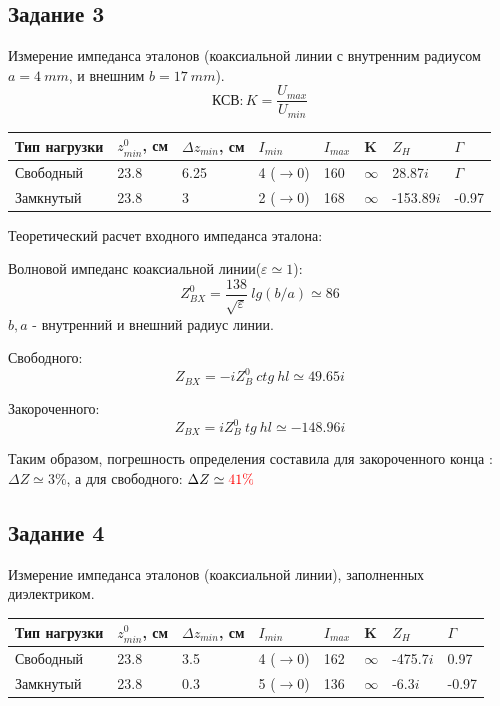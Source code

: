 \subsection{Задание 3}
Измерение импеданса эталонов (коаксиальной линии с внутренним радиусом $a = 4~mm$, и внешним $b=17~mm$).
$$\textbf{КСВ}: K = \frac{U_{max}}{U_{min}}$$
\begin{table}[H]
    \centering
    \begin{tabular}{l|l|l|l|l|l|l|l}
       Тип нагрузки  & $z^0_{min}$, см & $\Delta z_{min}$, см & $I_{min}$ & $I_{max}$ & K &  $Z_H$ & $\Gamma$ \\ \hline
       Свободный &   23.8   &   6.25    &   4 ($\rightarrow 0$)  &   160   &  $\infty$ &   28.87$i$ & $\Gamma$  \\ \hline
       Замкнутый &   23.8   &   3    &   2 ($\rightarrow 0$)   &   168   &  $\infty$  &  -153.89$i$  & -0.97  
    \end{tabular}
\end{table}

Теоретический расчет входного импеданса эталона:

Волновой импеданс коаксиальной линии($\varepsilon \simeq 1$):
\begin{equation}
    Z^0_{BX} = \frac{138}{\sqrt{\varepsilon}} ~lg(b/a) \simeq 86   
\end{equation}
$b,a$ - внутренний и внешний радиус линии. 

Свободного:
\begin{equation}
    Z_{BX}= -i Z^0_B~ctg~hl  \simeq 49.65i  
\end{equation}

Закороченного:
\begin{equation}
    Z_{BX}= i Z^0_B~tg~hl    \simeq -148.96i
\end{equation}

Таким образом, погрешность определения составила для закороченного конца :$\Delta Z \simeq 3 \% $, а для свободного:
$\Delta Z \simeq \textcolor{red}{41 \%}$

\subsection{Задание 4}
Измерение импеданса эталонов (коаксиальной линии), заполненных диэлектриком.

\begin{table}[H]
    \centering
    \begin{tabular}{l|l|l|l|l|l|l|l}
       Тип нагрузки  & $z^0_{min}$, см & $\Delta z_{min}$, см & $I_{min}$ & $I_{max}$ & K &  $Z_H$  & $\Gamma$\\ \hline
    Свободный &   23.8   &   3.5    &   4 ($\rightarrow 0$)  &   162   &  $\infty$ &  -475.7$i$ & 0.97 \\ \hline
    Замкнутый &   23.8   &   0.3    &   5 ($\rightarrow 0$)   &   136   &  $\infty$    &  -6.3$i$ & -0.97 
    \end{tabular}
\end{table}

